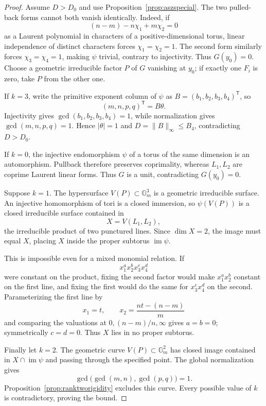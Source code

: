 \documentclass[11pt]{article}
\numberwithin{equation}{section}
\theoremstyle{definition}
\begin{document}
\begin{proof}
Assume \(D>D_0\) and use Proposition~\ref{prop:aszspecial}.  The two
pulled-back forms cannot both vanish identically.  Indeed, if
\[
 (n-m)-n\chi_1+m\chi_2=0
\]
as a Laurent polynomial in characters of a positive-dimensional torus,
linear independence of distinct characters forces
\(\chi_1=\chi_2=1\).  The second form similarly forces
\(\chi_3=\chi_4=1\), making \(\psi\) trivial, contrary to injectivity.
Thus \(G(y_0)=0\).  Choose a geometric irreducible factor \(P\) of \(G\)
vanishing at \(y_0\); if exactly one \(F_i\) is zero, take \(P\) from the
other one.

If \(k=3\), write the primitive exponent column of \(\psi\) as
\(B=(b_1,b_2,b_3,b_4)^{\mathsf T}\), so
\[
 (m,n,p,q)^{\mathsf T}=B\theta.
\]
Injectivity gives \(\gcd(b_1,b_2,b_3,b_4)=1\), while normalization gives
\(\gcd(m,n,p,q)=1\).  Hence \(|\theta|=1\) and
\(D=\|B\|_\infty\leq B_4\), contradicting \(D>D_0\).

If \(k=0\), the injective endomorphism \(\psi\) of a torus of the same
dimension is an automorphism.  Pullback therefore preserves coprimality,
whereas \(L_1,L_2\) are coprime Laurent linear forms.  Thus \(G\) is a
unit, contradicting \(G(y_0)=0\).

Suppose \(k=1\).  The hypersurface \(V(P)\subset\mathbb G_m^3\) is a
geometric irreducible surface.  An injective homomorphism of tori is a closed
immersion, so \(\psi(V(P))\) is a closed irreducible surface contained in
\[
 X=V(L_1,L_2),
\]
the irreducible product of two punctured lines.  Since \(\dim X=2\), the
image must equal \(X\), placing \(X\) inside the proper subtorus
\(\operatorname{im}\psi\).

This is impossible even for a mixed monomial relation.  If
\[
 x_1^a x_2^b x_3^c x_4^d
\]
were constant on the product, fixing the second factor would make
\(x_1^a x_2^b\) constant on the first line, and fixing the first would do
the same for \(x_3^c x_4^d\) on the second.  Parameterizing the first line
by
\[
 x_1=t,
 \qquad x_2=\frac{nt-(n-m)}m
\]
and comparing the valuations at \(0,(n-m)/n,\infty\) gives \(a=b=0\);
symmetrically \(c=d=0\).  Thus \(X\) lies in no proper subtorus.

Finally let \(k=2\).  The geometric curve \(V(P)\subset\mathbb G_m^2\)
has closed image contained in
\(X\cap\operatorname{im}\psi\) and passing through the specified point.
The global normalization gives
\[
 \gcd\bigl(\gcd(m,n),\gcd(p,q)\bigr)=1.
\]
Proposition~\ref{prop:ranktworigidity} excludes this curve.  Every possible
value of \(k\) is contradictory, proving the bound.
\end{proof}
\end{document}
